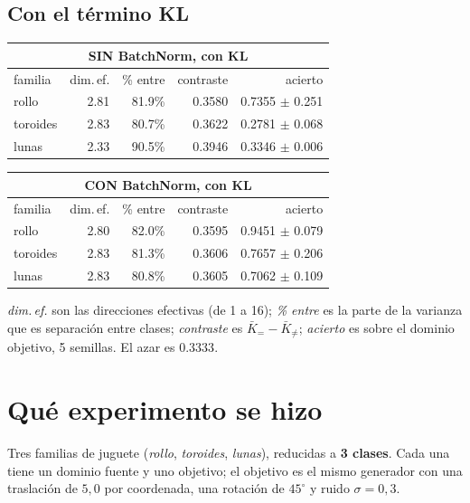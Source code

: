 \documentclass[11pt,a4paper]{article}
\begin{document}
\subsection*{Con el término KL}
\noindent
\begin{minipage}[t]{0.49\textwidth}
  \centering
  \footnotesize\setlength{\tabcolsep}{3pt}
  \begin{tabular}{lrrrr}
      \multicolumn{5}{c}{\textbf{SIN BatchNorm, con KL}} \\[2pt]
      \toprule
      familia & dim.\,ef. & \% entre & contraste & acierto \\
      \midrule
      rollo & 2.81 & 81.9\% & 0.3580 & 0.7355 $\pm$ 0.251 \\
      toroides & 2.83 & 80.7\% & 0.3622 & 0.2781 $\pm$ 0.068 \\
      lunas & 2.33 & 90.5\% & 0.3946 & 0.3346 $\pm$ 0.006 \\
      \bottomrule
    \end{tabular}
\end{minipage}\hfill
\begin{minipage}[t]{0.49\textwidth}
  \centering
  \footnotesize\setlength{\tabcolsep}{3pt}
  \begin{tabular}{lrrrr}
      \multicolumn{5}{c}{\textbf{CON BatchNorm, con KL}} \\[2pt]
      \toprule
      familia & dim.\,ef. & \% entre & contraste & acierto \\
      \midrule
      rollo & 2.80 & 82.0\% & 0.3595 & 0.9451 $\pm$ 0.079 \\
      toroides & 2.83 & 81.3\% & 0.3606 & 0.7657 $\pm$ 0.206 \\
      lunas & 2.83 & 80.8\% & 0.3605 & 0.7062 $\pm$ 0.109 \\
      \bottomrule
    \end{tabular}
\end{minipage}
\vspace{11pt}


\textit{dim.\,ef.} son las direcciones efectivas (de 1 a 16); \textit{\% entre} es
la parte de la varianza que es separación entre clases; \textit{contraste} es
$\bar K_{=} - \bar K_{\neq}$; \textit{acierto} es sobre el dominio objetivo, 5
semillas. El azar es $0.3333$.

\section{Qué experimento se hizo}

Tres familias de juguete (\textit{rollo}, \textit{toroides}, \textit{lunas}),
reducidas a \textbf{3 clases}. Cada una tiene un dominio fuente y uno objetivo; el
objetivo es el mismo generador con una traslación de $5{,}0$ por coordenada, una
rotación de $45^\circ$ y ruido $\sigma = 0{,}3$.
\end{document}
